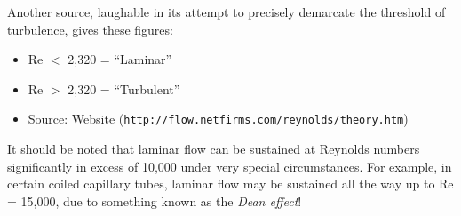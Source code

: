 Another source, laughable in its attempt to precisely demarcate the threshold of turbulence, gives these figures:

\begin{itemize}
\item{} Re $<$ 2,320 = ``Laminar''
\item{} Re $>$ 2,320 = ``Turbulent''
\item{} Source: Website ({\tt http://flow.netfirms.com/reynolds/theory.htm})
\end{itemize}

It should be noted that laminar flow can be sustained at Reynolds numbers significantly in excess of 10,000 under very special circumstances.  For example, in certain coiled capillary tubes, laminar flow may be sustained all the way up to Re = 15,000, due to something known as the {\it Dean effect}!











